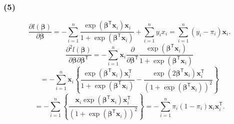 \documentclass[pdflatex,ja=standard]{bxjsarticle}
\begin{document}
\subsubsection*{(5)}
\begin{equation}
    \frac{\partial l(\bm{\beta})}{\partial \bm{\beta}} = - \sum_{i=1}^{n} \frac{ \exp(\bm{\beta}^{\mathsf{T}} \bm{x}_i ) \bm{x}_i}{ 1 +  \exp (\bm{\beta}^{\mathsf{T}} \bm{x}_i )} + \sum_{i=1}^{n} y_i x_i = \sum_{i=1}^{n} ( y_i - \pi_i ) \bm{x}_i.
\end{equation}
\begin{equation}
    \frac{\partial^2 l(\bm{\beta})}{\partial \bm{\beta} \partial \bm{\beta}^{\mathsf{T}}} = - \sum_{i=1}^{n} \bm{x}_i \frac{\partial}{\partial \bm{\beta}^{\mathsf{T}}} \frac{ \exp(\bm{\beta}^{\mathsf{T}} \bm{x}_i ) }{ 1 +  \exp (\bm{\beta}^{\mathsf{T}} \bm{x}_i )} 
\end{equation}
\begin{equation}
    = - \sum_{i=1}^{n} \bm{x}_i \left\{ \frac{ \exp(\bm{\beta}^{\mathsf{T}} \bm{x}_i ) \bm{x}_i^{\mathsf{T}} }{ 1 +  \exp (\bm{\beta}^{\mathsf{T}} \bm{x}_i )} -  \frac{ \exp(2\bm{\beta}^{\mathsf{T}} \bm{x}_i ) \bm{x}_i^{\mathsf{T}} }{ (1 +  \exp (\bm{\beta}^{\mathsf{T}} \bm{x}_i ))^2} \right\}
\end{equation}
\begin{equation}
    = - \sum_{i=1}^{n} \left\{ \frac{ \bm{x}_i  \exp(\bm{\beta}^{\mathsf{T}} \bm{x}_i ) \bm{x}_i^{\mathsf{T}} }{ (1 +  \exp (\bm{\beta}^{\mathsf{T}} \bm{x}_i ))^2} \right\}
    = - \sum_{i=1}^{n} \pi_i (1 - \pi_i) \bm{x}_{i} \bm{x}_{i}^{\mathsf{T}}.
\end{equation}
\end{document}
